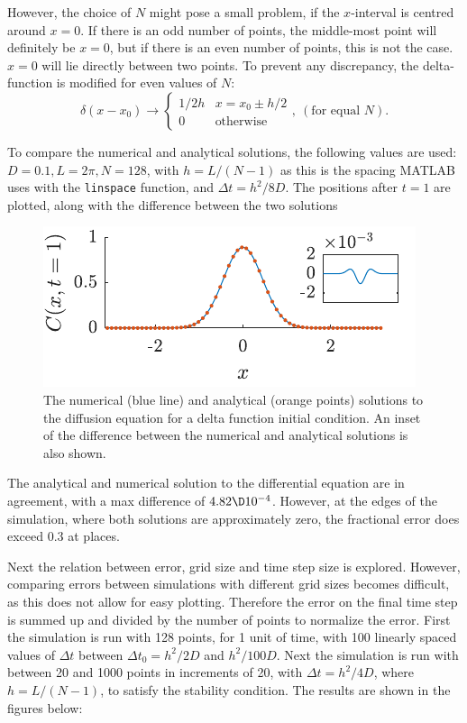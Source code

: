 \documentclass[a4paper,10pt]{article} 	%
\numberwithin{equation}{section}
\begin{document}
	However, the choice of $ N $ might pose a small problem, if the $ x $-interval is centred around $ x=0 $. If there is an odd number of points, the middle-most point will definitely be $ x=0 $, but if there is an even number of points, this is not the case. $ x = 0 $ will lie directly between two points. To prevent any discrepancy, the delta-function is modified for even values of $ N $:
	\begin{equation}\label{key}
	\delta(x-x_0) \to \begin{cases}
	1/2h & x=x_0\pm h/2 \\
	0 & \text{otherwise}
	\end{cases}, \ (\text{for equal } N).
	\end{equation}
	
	To compare the numerical and analytical solutions, the following values are used: $D = 0.1, L = 2\pi,N=128 $, with $ h=L/(N-1) $ as this is the spacing MATLAB uses with the \texttt{linspace} function, and $ \Delta t = h^2/8D $. The positions after $ t = 1 $ are plotted, along with the difference between the two solutions
	\begin{figure}[H]
		\centering
		\includegraphics[width = 0.5\linewidth]{diffSimple.pdf}
		\caption{The numerical (blue line) and analytical (orange points) solutions to the diffusion equation for a delta function initial condition. An inset of the difference between the numerical and analytical solutions is also shown.}
		\label{fig:diffSimple}
	\end{figure}
	The analytical and numerical solution to the differential equation are in agreement, with a max difference of $ 4.82\D10^{-4} $. However, at the edges of the simulation, where both solutions are approximately zero, the fractional error does exceed 0.3 at places.
	
	Next the relation between error, grid size and time step size is explored. However, comparing errors between simulations with different grid sizes becomes difficult, as this does not allow for easy plotting. Therefore the error on the final time step is summed up and divided by the number of points to normalize the error. First the simulation is run with 128 points, for 1 unit of time, with 100 linearly spaced values of $ \Delta t $ between $ \Delta t_0 = h^2/2D $ and $ h^2/100D $. Next the simulation is run with between 20 and 1000 points in increments of 20, with $ \Delta t = h^2/4D $, where $ h = L/(N-1) $, to satisfy the stability condition. The results are shown in the figures below:
	 
\end{document}

